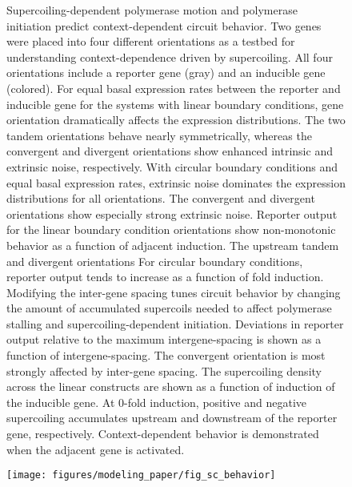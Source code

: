 \documentclass[11pt]{article}
\begin{document}
\begin{figure}
    \ContinuedFloat
    \caption{Supercoiling-dependent polymerase motion and polymerase initiation predict context-dependent circuit behavior.
         Two genes were placed into four different orientations as a testbed for understanding context-dependence driven by supercoiling. All four orientations include a reporter gene (gray) and an inducible gene (colored).
         For equal basal expression rates between the reporter and inducible gene for the systems with linear boundary conditions, gene orientation dramatically affects the expression distributions. The two tandem orientations behave nearly symmetrically, whereas the convergent and divergent orientations show enhanced intrinsic and extrinsic noise, respectively.
         With circular boundary conditions and equal basal expression rates, extrinsic noise dominates the expression distributions for all orientations. The convergent and divergent orientations show especially strong extrinsic noise.
         Reporter output for the linear boundary condition orientations show non-monotonic behavior as a function of adjacent induction. The upstream tandem and divergent orientations
         For circular boundary conditions, reporter output tends to increase as a function of fold induction.
         Modifying the inter-gene spacing tunes circuit behavior by changing the amount of accumulated supercoils needed to affect polymerase stalling and supercoiling-dependent initiation.
         Deviations in reporter output relative to the maximum intergene-spacing is shown as a function of intergene-spacing. The convergent orientation is most strongly affected by inter-gene spacing.
         The supercoiling density across the linear constructs are shown as a function of induction of the inducible gene. At 0-fold induction, positive and negative supercoiling accumulates upstream and downstream of the reporter gene, respectively. Context-dependent behavior is demonstrated when the adjacent gene is activated.
    } \label{fig:top:orientation_bc_behavior}
\end{figure}
\begin{figure}[htbp]
    \centering
    {\texttt{[image: figures/modeling\_paper/fig\_sc\_behavior]}
    \label{fig:sc_examples_convergent_divergent}
    \label{fig:sc_density_convergent_divergent}
    \label{fig:burst_dynamics_convergent_divergent}
    \label{fig:sc_examples_tandem}
    \label{fig:sc_density_tandem}
    \label{fig:burst_dynamics_tandem}
    \label{fig:cross_correlation_cartoon}
    \label{fig:orientation_cross_correlation}
    \label{fig:output_distribution_by_orientation_dynamics}
    \label{fig:noise_by_orientation}
    }
\end{figure}
\end{document}

